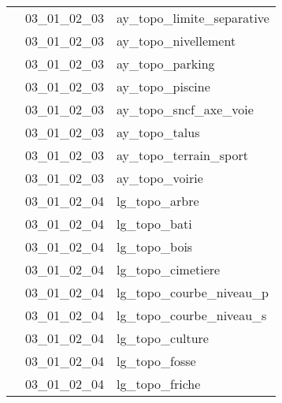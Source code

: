 \documentclass[12pt,titlepage,oneside]{book}
\begin{document}
\begin{supertabular}{|p{10cm}|c|p{15cm}|}
                    & 03\_01\_02\_03 & ay\_topo\_limite\_separative\\


                    & 03\_01\_02\_03 & ay\_topo\_nivellement\\


                    & 03\_01\_02\_03 & ay\_topo\_parking\\


                    & 03\_01\_02\_03 & ay\_topo\_piscine\\


                    & 03\_01\_02\_03 & ay\_topo\_sncf\_axe\_voie\\


                    & 03\_01\_02\_03 & ay\_topo\_talus\\


                    & 03\_01\_02\_03 & ay\_topo\_terrain\_sport\\


                    & 03\_01\_02\_03 & ay\_topo\_voirie\\


                    & 03\_01\_02\_04 & lg\_topo\_arbre\\


                    & 03\_01\_02\_04 & lg\_topo\_bati\\


                    & 03\_01\_02\_04 & lg\_topo\_bois\\


                    & 03\_01\_02\_04 & lg\_topo\_cimetiere\\


                    & 03\_01\_02\_04 & lg\_topo\_courbe\_niveau\_p\\


                    & 03\_01\_02\_04 & lg\_topo\_courbe\_niveau\_s\\


                    & 03\_01\_02\_04 & lg\_topo\_culture\\


                    & 03\_01\_02\_04 & lg\_topo\_fosse\\


                    & 03\_01\_02\_04 & lg\_topo\_friche\\



\end{supertabular}
\end{document}
